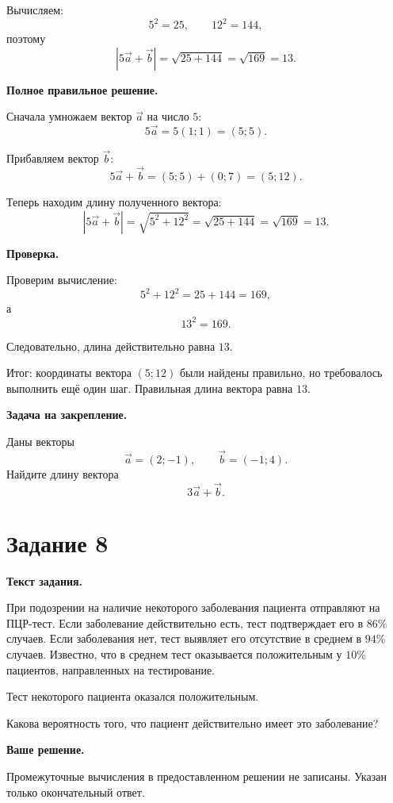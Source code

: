 \documentclass[12pt,a4paper]{article}
\newcommand{\resultlabel}[1]{\textcolor{reviewteal!80!black}{Итог:} #1}
\begin{document}
Вычисляем:
\[
5^2=25,
\qquad
12^2=144,
\]
поэтому
\[
|5\vec a+\vec b|
=
\sqrt{25+144}
=
\sqrt{169}
=
13.
\]

\textbf{Полное правильное решение.}

Сначала умножаем вектор $\vec a$ на число $5$:
\[
5\vec a
=
5(1;1)
=
(5;5).
\]

Прибавляем вектор $\vec b$:
\[
5\vec a+\vec b
=
(5;5)+(0;7)
=
(5;12).
\]

Теперь находим длину полученного вектора:
\[
|5\vec a+\vec b|
=
\sqrt{5^2+12^2}
=
\sqrt{25+144}
=
\sqrt{169}
=
13.
\]

\textbf{Проверка.}

Проверим вычисление:
\[
5^2+12^2=25+144=169,
\]
а
\[
13^2=169.
\]

Следовательно, длина действительно равна $13$.

\resultlabel{ координаты вектора $(5;12)$ были найдены правильно, но требовалось выполнить ещё один шаг. Правильная длина вектора равна $13$.}

\textbf{Задача на закрепление.}

Даны векторы
\[
\vec a=(2;-1),
\qquad
\vec b=(-1;4).
\]
Найдите длину вектора
\[
3\vec a+\vec b.
\]


\newpage
{}
\label{task:8}

\section*{Задание 8}

\textbf{Текст задания.}

При подозрении на наличие некоторого заболевания пациента отправляют
на ПЦР-тест. Если заболевание действительно есть, тест подтверждает его
в $86\%$ случаев. Если заболевания нет, тест выявляет его отсутствие
в среднем в $94\%$ случаев. Известно, что в среднем тест оказывается
положительным у $10\%$ пациентов, направленных на тестирование.

Тест некоторого пациента оказался положительным.

Какова вероятность того, что пациент действительно имеет это заболевание?

\textbf{Ваше решение.}

Промежуточные вычисления в предоставленном решении не записаны.
Указан только окончательный ответ.
\end{document}

